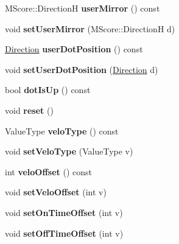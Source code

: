 \begin{DoxyCompactItemize}
M\+Score\+::\+DirectionH {\bfseries user\+Mirror} () const
\item 
\mbox{\label{class_ms_1_1_note_a934b214a5a619e1a2a35d2540aa35e82}} 
void {\bfseries set\+User\+Mirror} (M\+Score\+::\+DirectionH d)
\item 
\mbox{\label{class_ms_1_1_note_ad9eec4888c9aa3acb109163a2b1819a5}} 
\hyperlink{class_ms_1_1_direction}{Direction} {\bfseries user\+Dot\+Position} () const
\item 
\mbox{\label{class_ms_1_1_note_afaf580b66a43a434bc70fcad9546e7cc}} 
void {\bfseries set\+User\+Dot\+Position} (\hyperlink{class_ms_1_1_direction}{Direction} d)
\item 
\mbox{\label{class_ms_1_1_note_a256b98dd7bc0bb70cd07038f95a918a5}} 
bool {\bfseries dot\+Is\+Up} () const
\item 
\mbox{\label{class_ms_1_1_note_a0820a999e6acef4689a256d80c9805cb}} 
void {\bfseries reset} ()
\item 
\mbox{\label{class_ms_1_1_note_a35a050f6696d45ea0139ebb782f913b9}} 
Value\+Type {\bfseries velo\+Type} () const
\item 
\mbox{\label{class_ms_1_1_note_ac07831538c8525825635e07bd69bfe28}} 
void {\bfseries set\+Velo\+Type} (Value\+Type v)
\item 
\mbox{\label{class_ms_1_1_note_aec8b51971a64bc6de5794e133e72c219}} 
int {\bfseries velo\+Offset} () const
\item 
\mbox{\label{class_ms_1_1_note_a23bd44a49d6ec5ef2f7be99a9dfa8bcb}} 
void {\bfseries set\+Velo\+Offset} (int v)
\item 
\mbox{\label{class_ms_1_1_note_a6f58e66a31fa80f8cfd8d11cd9aebba1}} 
void {\bfseries set\+On\+Time\+Offset} (int v)
\item 
\mbox{\label{class_ms_1_1_note_a589e03cd1337c1e59e5a237df70e203a}} 
void {\bfseries set\+Off\+Time\+Offset} (int v)

\end{DoxyCompactItemize}
